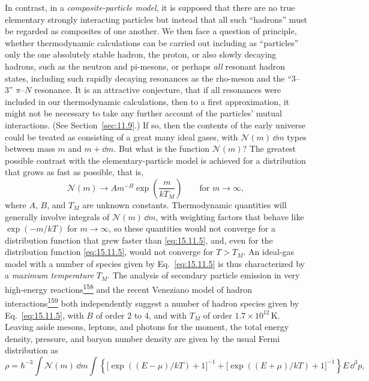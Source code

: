 In contrast, in a \emph{composite-particle model}, it is supposed that there
are no true elementary strongly interacting particles but instead that all
such ``hadrons'' must be regarded as composites of one another. We then face a
question of principle, whether thermodynamic calculations can be carried out
including as ``particles'' only the one absolutely stable hadron, the proton,
or also slowly decaying hadrons, such as the neutron and pi-mesons, or perhaps
\emph{all} resonant hadron states, including such rapidly decaying resonances
as the rho-meson and the ``3--3'' \(\pi\)--\(N\) resonance. It is an
attractive conjecture, that if all resonances were included in our
thermodynamic calculations, then to a first approximation, it might not be
necessary to take any further account of the particles' mutual interactions.
(See Section~\ref{sec:11.9}.) If so, then the contents of the early universe
could be treated as consisting of a great many ideal gases, with
\(\mathcal N(m)\,\dd m\) types between mass \(m\) and \(m+\dd m\). But
what is the function \(\mathcal N(m)\)? The greatest possible contrast with
the elementary-particle model is achieved for a distribution that grows as
fast as possible, that is,
\begin{equation}
  \mathcal N(m)
  \longrightarrow
  Am^{-B}\exp\left(\frac{m}{kT_M}\right)
  \qquad\text{for }m\to\infty,
  \tag{15.11.5}\label{eq:15.11.5}
\end{equation}
where \(A\), \(B\), and \(T_M\) are unknown constants. Thermodynamic
quantities will generally involve integrals of \(\mathcal N(m)\,\dd m\),
with weighting factors that behave like \(\exp(-m/kT)\) for
\(m\to\infty\), so these quantities would not converge for a distribution
function that grew faster than \eqref{eq:15.11.5}, and, even for the
distribution function \eqref{eq:15.11.5}, would not converge for
\(T>T_M\). An ideal-gas model with a number of species given by
Eq.~\eqref{eq:15.11.5} is thus characterized by a \emph{maximum temperature}
\(T_M\). The analysis of secondary particle emission in very high-energy
reactions\hyperref[ch15-ref-158]{\textsuperscript{158}} and the recent
Veneziano model of hadron
interactions\hyperref[ch15-ref-159]{\textsuperscript{159}} both independently
suggest a number of hadron species given by Eq.~\eqref{eq:15.11.5}, with
\(B\) of order 2 to 4, and with \(T_M\) of order
\(1.7\times10^{12}\,\mathrm K\). Leaving aside mesons, leptons, and photons
for the moment, the total energy density, pressure, and baryon number density
are given by the usual Fermi distribution as
\begin{equation}
  \rho
  =
  \hbar^{-3}
  \int\mathcal N(m)\,\dd m
  \int
  \left\{
    \bigl[\exp((E-\mu)/kT)+1\bigr]^{-1}
    +\bigl[\exp((E+\mu)/kT)+1\bigr]^{-1}
  \right\}
  E\,\dd^3p,
  \tag{15.11.6}\label{eq:15.11.6}
\end{equation}
